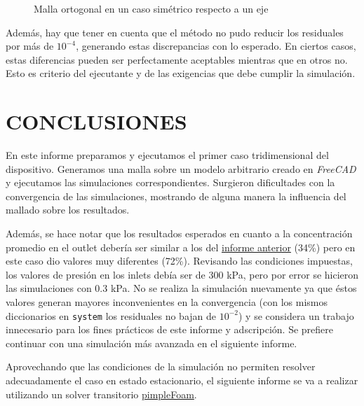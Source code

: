 \documentclass[oneside,a4paper,spanish,links]{amca}
\begin{document}
\begin{figure}[htb]
	\centerline{
	}
	\caption{Malla ortogonal en un caso simétrico respecto a un eje} \label{fg:05_hexa_glyph}
\end{figure}

Además, hay que tener en cuenta que el método no pudo reducir los residuales por más de $10^{-4}$, generando estas discrepancias con lo esperado. En ciertos casos, estas diferencias pueden ser perfectamente aceptables mientras que en otros no. Esto es criterio del ejecutante y de las exigencias que debe cumplir la simulación.

\section{CONCLUSIONES}
En este informe preparamos y ejecutamos el primer caso tridimensional del dispositivo. Generamos una malla sobre un modelo arbitrario creado en \textit{FreeCAD} y ejecutamos las simulaciones correspondientes. Surgieron dificultades con la convergencia de las simulaciones, mostrando de alguna manera la influencia del mallado sobre los resultados.

Además, se hace notar que los resultados esperados en cuanto a la concentración promedio en el outlet debería ser similar a los del \href{https://github.com/guillerolle/informes_cfd/blob/master/Informe02.pdf}{informe anterior} (34\%) pero en este caso dio valores muy diferentes (72\%). Revisando las condiciones impuestas, los valores de presión en los inlets debía ser de 300 kPa, pero por error se hicieron las simulaciones con 0.3 kPa. No se realiza la simulación nuevamente ya que éstos valores generan mayores inconvenientes en la convergencia (con los mismos diccionarios en \texttt{system} los residuales no bajan de $10^{-2}$) y se considera un trabajo innecesario para los fines prácticos de este informe y adscripción. Se prefiere continuar con una simulación más avanzada en el siguiente informe.

Aprovechando que las condiciones de la simulación no permiten resolver adecuadamente el caso en estado estacionario, el siguiente informe se va a realizar utilizando un solver transitorio \href{https://www.openfoam.com/documentation/guides/latest/doc/guide-applications-solvers-incompressible-pimpleFoam.html}{pimpleFoam}.

%
%
\end{document}
